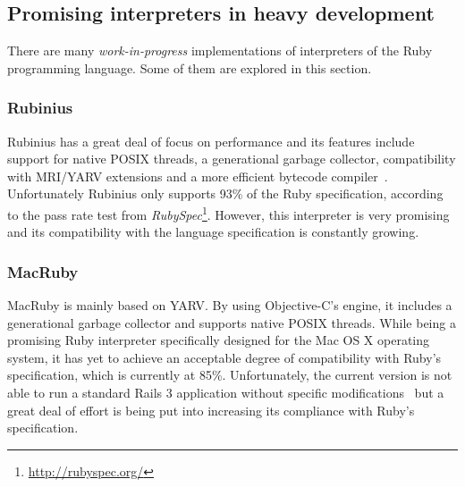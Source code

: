 \subsection{Promising interpreters in heavy development}

There are many \textit{work-in-progress} implementations of interpreters of the Ruby programming language. Some of them are explored in this section.

\subsubsection{Rubinius}

Rubinius has a great deal of focus on performance and its features include support for native POSIX threads, a generational garbage collector, compatibility with MRI/YARV extensions and a more efficient bytecode compiler~\cite{rubinius, rubinius_virtual_machine, rubinius_virtual_machine_rewrite}. Unfortunately Rubinius only supports 93\% of the Ruby specification, according to the pass rate test from \textit{RubySpec}\footnote{\url{http://rubyspec.org/}}. However, this interpreter is very promising and its compatibility with the language specification is constantly growing.


\subsubsection{MacRuby}

MacRuby is mainly based on YARV. By using Objective-C's engine, it includes a generational garbage collector and supports native POSIX threads. While being a promising Ruby interpreter specifically designed for the Mac OS X operating system, it has yet to achieve an acceptable degree of compatibility with Ruby's specification, which is currently at 85\%. Unfortunately, the current version is not able to run a standard Rails 3 application without specific modifications~\cite{macruby_06} but a great deal of effort is being put into increasing its compliance with Ruby's specification.
